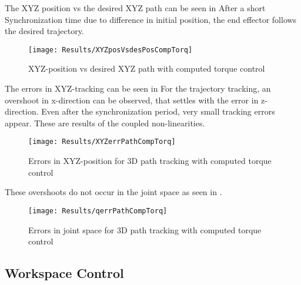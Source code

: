 The XYZ position vs the desired XYZ path can be seen in %
After a short Synchronization time due to difference in initial position, the end effector follows the desired trajectory.
\begin{figure}[H]
	\texttt{[image: Results/XYZposVsdesPosCompTorq]}
	\caption{XYZ-position vs desired XYZ path with computed torque control}
	\label{fig:XYZposVsdesPosCompTorq}
\end{figure}
The errors in XYZ-tracking can be seen in  %
For the trajectory tracking, an overshoot in x-direction can be observed, that settles with the error in z-direction. 
Even after the synchronization period, very small tracking errors appear. These are results of the coupled non-linearities.
\begin{figure}[H]
	\texttt{[image: Results/XYZerrPathCompTorq]}
	\caption{Errors in XYZ-position for 3D path tracking with computed torque control}
	\label{fig:XYZerrPathCompTorq}
\end{figure}

These overshoots do not occur in the joint space as seen in .
\begin{figure}[H]
	\texttt{[image: Results/qerrPathCompTorq]}
	\caption{Errors in joint space for 3D path tracking with computed torque control}
	\label{fig:qerrPathCompTorq}
\end{figure}




\subsection{Workspace Control}

